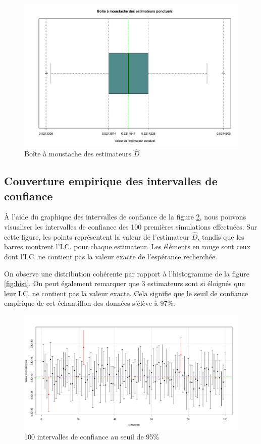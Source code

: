 \documentclass[paper=a4, fontsize=11pt]{scrartcl}
\begin{document}
\begin{figure}[H]
  \centering
  \includegraphics[scale=0.5]{../analysis/plots/BoxPlot.pdf}
  \caption{Boîte à moustache des estimateurs $\widehat{D}$}
  \label{fig:boxplot}
\end{figure}

\subsection{Couverture empirique des intervalles de confiance}

À l'aide du graphique des intervalles de confiance de la figure \ref{fig:CIPlot}, nous pouvons visualiser les intervalles de confiance des 100 premières simulations effectuées. Sur cette figure, les points représentent la valeur de l'estimateur $\widehat{D}$, tandis que les barres montrent l'I.C. pour chaque estimateur. Les éléments en rouge sont ceux dont l'I.C. ne contient pas la valeur exacte de l'espérance recherchée.

On observe une distribution cohérente par rapport à l'histogramme de la figure \ref{fig:hist}. On peut également remarquer que 3 estimateurs sont si éloignés que leur I.C. ne contient pas la valeur exacte. Cela signifie que le seuil de confiance empirique de cet échantillon des données s'élève à 97\%.

\begin{figure}[H]
  \centering
  \includegraphics[scale=0.46]{../analysis/plots/CIplot.pdf}
  \caption{100 intervalles de confiance au seuil de 95\%}
  \label{fig:CIPlot}
\end{figure}
\end{document}
